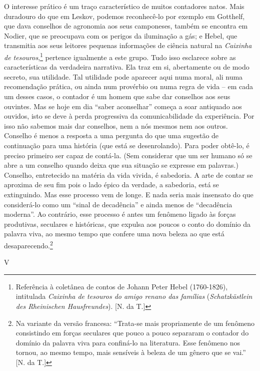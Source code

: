 O interesse prático é um traço característico de muitos contadores
natos. Mais duradouro do que em Leskov, podemos reconhecê-lo por exemplo
em Gotthelf, que dava conselhos de agronomia aos seus camponeses, também
se encontra em Nodier, que se preocupava com os perigos da iluminação a
gás; e Hebel, que transmitia aos seus leitores pequenas informações de
ciência natural na \emph{Caixinha de tesouros},\footnote{Referência à
  coletânea de contos de Johann Peter Hebel (1760-1826), intitulada
  \emph{Caixinha de tesouros do amigo renano das famílias}
  (\emph{Schatzkästlein des Rheinischen Hausfreundes}). {[}N. da T.{]}}
pertence igualmente a este grupo. Tudo isso esclarece sobre as
características da verdadeira narrativa. Ela traz em si, abertamente ou
de modo secreto, sua utilidade. Tal utilidade pode aparecer aqui numa
moral, ali numa recomendação prática, ou ainda num provérbio ou numa
regra de vida -- em cada um desses casos, o contador é um homem que sabe
dar conselhos aos seus ouvintes. Mas se hoje em dia ``saber aconselhar''
começa a soar antiquado aos ouvidos, isto se deve à perda progressiva da
comunicabilidade da experiência. Por isso não sabemos mais dar
conselhos, nem a nós mesmos nem aos outros. Conselho é menos a resposta
a uma pergunta do que uma sugestão de continuação para uma história (que
está se desenrolando). Para poder obtê-lo, é preciso primeiro ser capaz
de contá-la. (Sem considerar que um ser humano só se abre a um conselho
quando deixa que sua situação se expresse em palavras.) Conselho,
entretecido na matéria da vida vivida, é sabedoria. A arte de contar se
aproxima de seu fim pois o lado épico da verdade, a sabedoria, está se
extinguindo. Mas esse processo vem de longe. E nada seria mais insensato
do que considerá-lo como um ``sinal de decadência'' e ainda menos de
``decadência moderna''. Ao contrário, esse processo é antes um fenômeno
ligado às forças produtivas, seculares e históricas, que expulsa aos
poucos o conto do domínio da palavra viva, ao mesmo tempo que confere
uma nova beleza ao que está desaparecendo.\footnote{Na variante da
  versão francesa: ``Trata-se mais propriamente de um fenômeno
  consistindo em forças seculares que pouco a pouco separaram o contador
  do domínio da palavra viva para confiná-lo na literatura. Esse
  fenômeno nos tornou, ao mesmo tempo, mais sensíveis à beleza de um
  gênero que se vai.'' {[}N. da T.{]}}

V

